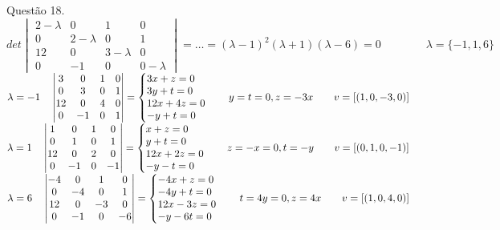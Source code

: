 \documentclass[12pt]{article}
\begin{document}
\noindent Questão 18.\\

$det\begin{vmatrix}2-\lambda&0&1&0\\0&2-\lambda&0&1\\12&0&3-\lambda&0\\0&-1&0&0-\lambda\end{vmatrix}=\dots=(\lambda-1)^2(\lambda+1)(\lambda-6)=0\qquad\qquad\lambda=\lbrace-1,1,6\rbrace$\\

$\lambda=-1\quad\begin{vmatrix}3&0&1&0\\0&3&0&1\\12&0&4&0\\0&-1&0&1\end{vmatrix}=\left\{\begin{array}{@{}l@{}}3x+z=0\\3y+t=0\\12x+4z=0\\-y+t=0\end{array}\right.\qquad y=t=0,z=-3x\qquad v=[(1,0,-3,0)]$\\

$\lambda=1\quad\begin{vmatrix}1&0&1&0\\0&1&0&1\\12&0&2&0\\0&-1&0&-1\end{vmatrix}=\left\{\begin{array}{@{}l@{}}x+z=0\\y+t=0\\12x+2z=0\\-y-t=0\end{array}\right.\qquad z=-x=0,t=-y\qquad v=[(0,1,0,-1)]$\\

$\lambda=6\quad\begin{vmatrix}-4&0&1&0\\0&-4&0&1\\12&0&-3&0\\0&-1&0&-6\end{vmatrix}=\left\{\begin{array}{@{}l@{}}-4x+z=0\\-4y+t=0\\12x-3z=0\\-y-6t=0\end{array}\right.\qquad t=4y=0,z=4x\qquad v=[(1,0,4,0)]$\\
\end{document}
